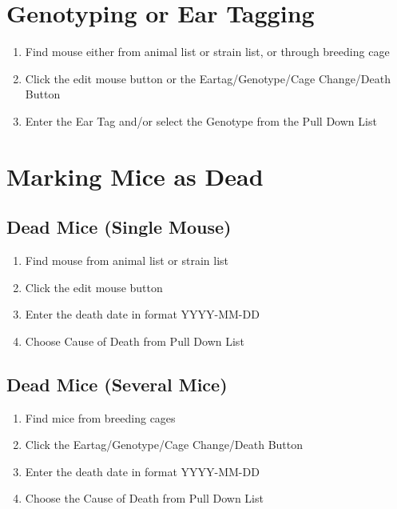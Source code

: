 \documentclass[letterpaper,10pt,english]{sphinxmanual}
\begin{document}
\section{Genotyping or Ear Tagging}
\begin{enumerate}
\item {} 
Find mouse either from animal list or strain list, or through breeding cage

\item {} 
Click the edit mouse button or the Eartag/Genotype/Cage Change/Death Button

\item {} 
Enter the Ear Tag and/or select the Genotype from the Pull Down List

\end{enumerate}


\section{Marking Mice as Dead}


\subsection{Dead Mice (Single Mouse)}
\begin{enumerate}
\item {} 
Find mouse from animal list or strain list

\item {} 
Click the edit mouse button

\item {} 
Enter the death date in format YYYY-MM-DD

\item {} 
Choose Cause of Death from Pull Down List

\end{enumerate}


\subsection{Dead Mice (Several Mice)}
\begin{enumerate}
\item {} 
Find mice from breeding cages

\item {} 
Click the Eartag/Genotype/Cage Change/Death Button

\item {} 
Enter the death date in format YYYY-MM-DD

\item {} 
Choose the Cause of Death from Pull Down List

\end{enumerate}
\end{document}
